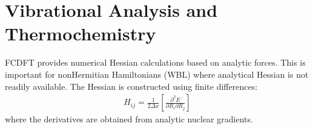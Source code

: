 \documentclass[letterpaper,10pt,english]{sphinxmanual}
\begin{document}
\begin{sphinxVerbatim}[commandchars=\\\{\}]
 
   
\end{sphinxVerbatim}


\section{Vibrational Analysis and Thermochemistry}
\label{\detokenize{examples:vibrational-analysis-and-thermochemistry}}
\sphinxAtStartPar
FC\sphinxhyphen{}DFT provides numerical Hessian calculations based on analytic forces. This is important for non\sphinxhyphen{}Hermitian Hamiltonians (WBL) where analytical Hessian is not readily available. The Hessian is constructed using finite differences:
\begin{equation*}
\begin{split}H_{ij} = \frac{1}{2\Delta x}\left[\frac{\partial^2 E}{\partial R_i \partial R_j}\right]\end{split}
\end{equation*}
\sphinxAtStartPar
where the derivatives are obtained from analytic nuclear gradients.
\end{document}
